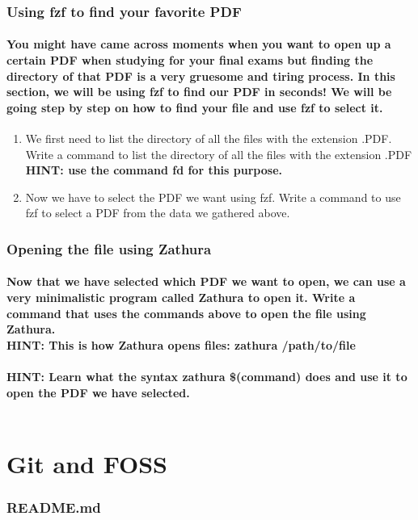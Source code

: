 \documentclass{article}
\begin{document}
\subsubsection{Using fzf to find your favorite PDF}
\paragraph{You might have came across moments when you want to open up a certain PDF when
studying for your final exams but finding the directory of that PDF is a very gruesome
and tiring process. In this section, we will be using fzf to find our PDF in seconds! We
will be going step by step on how to find your file and use fzf to select it.}
\begin{enumerate}
    \item We first need to list the directory of all the files with the extension .PDF. Write a
command to list the directory of all the files with the extension .PDF\\
\bf{HINT:} use the command fd for this purpose.
    \item Now we have to select the PDF we want using fzf. Write a command to use fzf to
select a PDF from the data we gathered above.
\end{enumerate}
\subsubsection{Opening the file using Zathura}
\paragraph{Now that we have selected which PDF we want to open, we can use a very minimalistic
program called Zathura to open it. Write a command that uses the commands above to
open the file using Zathura.\\
\bf{HINT:} This is how Zathura opens files: zathura /path/to/file\\ \\
\bf{HINT:} Learn what the syntax zathura \$(command) does and use it to open the PDF
we have selected.\\ \\}
\section{Git and FOSS}
\subsubsection{README.md}
\end{document}
